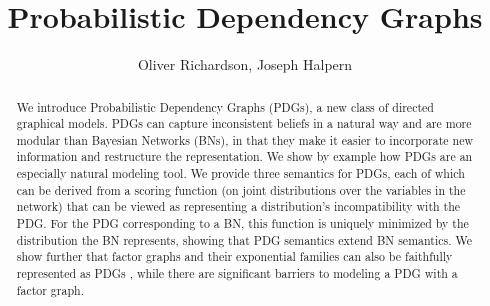\documentclass[letterpaper]{article} %
\title{Probabilistic Dependency Graphs}
\author{
	Oliver Richardson, Joseph Halpern \\
}
\theoremstyle{plain}
\theoremstyle{definition}
\theoremstyle{remark}
\newif\ifbody\bodytrue
\begin{document}
\ifbody
\maketitle
\begin{abstract}
We introduce Probabilistic Dependency Graphs (PDGs), a new class of
directed graphical models.   PDGs can capture inconsistent beliefs in a
natural way and are more modular than Bayesian Networks (BNs), in that
they make it easier to incorporate new information and restructure the  
representation.    We show by example how PDGs are an especially natural
modeling tool.
We provide three semantics for PDGs, each of which can be derived from a
scoring function (on joint distributions over the
variables in the network) that can be viewed as representing a
distribution's incompatibility with the PDG.
For the PDG corresponding
to a BN, this function is uniquely minimized by the distribution the
BN represents, showing that PDG semantics extend BN semantics.  
We show further that factor graphs
and their exponential families
can also be faithfully represented as PDGs%
, while there are significant barriers to modeling a PDG with a factor graph.
\end{abstract}
\end{document}
